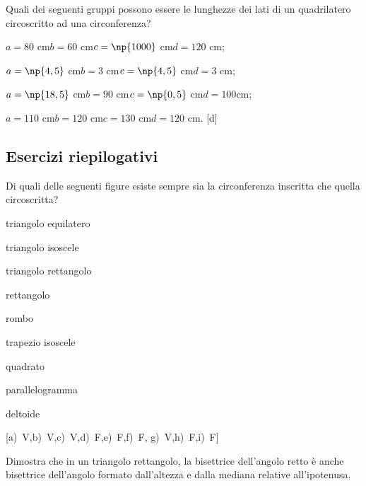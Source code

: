 \begin{esercizio}
\label{ese:5.42}
Quali dei seguenti gruppi possono essere le lunghezze dei lati di un 
quadrilatero circoscritto ad una circonferenza?
\begin{enumeratea}
\item $a=80$ cm\quad $b=60$ cm\quad $c=\np{1000}$ cm\quad $d=120$ cm;
\item $a=\np{4,5}$ cm\quad $b=3$ cm\quad $c=\np{4,5}$ cm\quad $d=3$ cm;
\item $a=\np{18,5}$ cm\quad $b=90$ cm\quad $c=\np{0,5}$ cm\quad $d=100$cm;
\item $a=110$ cm\quad $b=120$ cm\quad $c=130$ cm\quad $d=120$ cm.
\hfill [d]
\end{enumeratea}
\end{esercizio}

\subsection{Esercizi riepilogativi}

\begin{esercizio}
\label{ese:5.43}
Di quali delle seguenti figure esiste sempre sia la circonferenza 
inscritta che quella circoscritta?
\begin{multicols}{2}
\begin{enumeratea}
\item triangolo equilatero\hfill\boxV\quad\boxF
\item triangolo isoscele\hfill\boxV\quad\boxF
\item triangolo rettangolo\hfill\boxV\quad\boxF
\item rettangolo\hfill\boxV\quad\boxF
\item rombo\hfill\boxV\quad\boxF
\item trapezio isoscele\hfill\boxV\quad\boxF
\item quadrato\hfill\boxV\quad\boxF
\item parallelogramma\hfill\boxV\quad\boxF
\item deltoide\hfill\boxV\quad\boxF
\end{enumeratea}
\end{multicols}
\hfill [a)~V,\quad b)~V,\quad c)~V,\quad d)~F,\quad e)~F,\quad f)~F,\quad 
g)~V,\quad h)~F,\quad i)~F]
\end{esercizio}

\begin{esercizio}
\label{ese:5.51}
Dimostra che in un triangolo rettangolo, la bisettrice dell'angolo 
retto è anche bisettrice dell'angolo formato dall'altezza e dalla 
mediana relative all'ipotenusa.
\end{esercizio}

